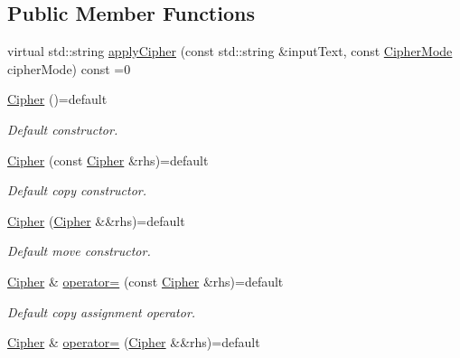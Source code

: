 \subsection*{Public Member Functions}
\begin{DoxyCompactItemize}
\item 
virtual std\+::string \hyperlink{class_cipher_ac6bbaa662c40483f3c0722109caf8572}{apply\+Cipher} (const std\+::string \&input\+Text, const \hyperlink{_cipher_mode_8hpp_ac3adaabf9bad553901589ddf3de6daf5}{Cipher\+Mode} cipher\+Mode) const =0
\item 
\hyperlink{class_cipher_a0f61b1dd7eb5a62d182cc7266600ff08}{Cipher} ()=default\hypertarget{class_cipher_a0f61b1dd7eb5a62d182cc7266600ff08}{}\label{class_cipher_a0f61b1dd7eb5a62d182cc7266600ff08}

\begin{DoxyCompactList}\small\item\em Default constructor. \end{DoxyCompactList}\item 
\hyperlink{class_cipher_a62a7b56af4d11ab44cbdb701adf6b3ea}{Cipher} (const \hyperlink{class_cipher}{Cipher} \&rhs)=default\hypertarget{class_cipher_a62a7b56af4d11ab44cbdb701adf6b3ea}{}\label{class_cipher_a62a7b56af4d11ab44cbdb701adf6b3ea}

\begin{DoxyCompactList}\small\item\em Default copy constructor. \end{DoxyCompactList}\item 
\hyperlink{class_cipher_a4ec5184e4bada371aebcca06cb3725ff}{Cipher} (\hyperlink{class_cipher}{Cipher} \&\&rhs)=default\hypertarget{class_cipher_a4ec5184e4bada371aebcca06cb3725ff}{}\label{class_cipher_a4ec5184e4bada371aebcca06cb3725ff}

\begin{DoxyCompactList}\small\item\em Default move constructor. \end{DoxyCompactList}\item 
\hyperlink{class_cipher}{Cipher} \& \hyperlink{class_cipher_ada389c6da626cade301d7b0ef5a5a22b}{operator=} (const \hyperlink{class_cipher}{Cipher} \&rhs)=default\hypertarget{class_cipher_ada389c6da626cade301d7b0ef5a5a22b}{}\label{class_cipher_ada389c6da626cade301d7b0ef5a5a22b}

\begin{DoxyCompactList}\small\item\em Default copy assignment operator. \end{DoxyCompactList}\item 
\hyperlink{class_cipher}{Cipher} \& \hyperlink{class_cipher_af0def19925ad32238ca0d7a74a90f115}{operator=} (\hyperlink{class_cipher}{Cipher} \&\&rhs)=default\hypertarget{class_cipher_af0def19925ad32238ca0d7a74a90f115}{}\label{class_cipher_af0def19925ad32238ca0d7a74a90f115}


\end{DoxyCompactItemize}
